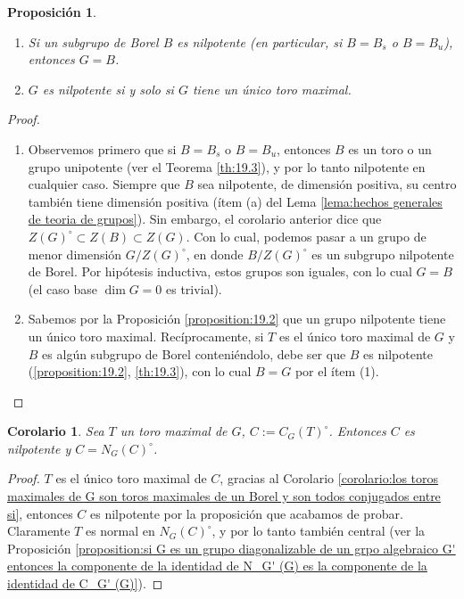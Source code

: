 \documentclass[spanish,10pt]{amsart}
\newtheorem{corollary}[theorem]{Corolario}
\newtheorem{proposition}[theorem]{Proposición}
\theoremstyle{definition}
\theoremstyle{remark}
\numberwithin{equation}{section}
\begin{document}
\begin{proposition}
\begin{enumerate}[(1)]
\item Si un subgrupo de Borel $B$ es nilpotente (en particular, si $B = B_s$ o $B = B_u$), entonces $G = B$.
\item $G$ es nilpotente si y solo si $G$ tiene un único toro maximal.
\end{enumerate}
\end{proposition}
\begin{proof}
\begin{enumerate}[(1)]
\item Observemos primero que si $B = B_s$ o $B = B_u$, entonces $B$ es un toro o un grupo unipotente (ver el Teorema \ref{th:19.3}), y por lo tanto nilpotente en cualquier caso. Siempre que $B$ sea nilpotente, de dimensión positiva, su centro también tiene dimensión positiva (ítem (a) del Lema \ref{lema:hechos generales de teoria de grupos}). Sin embargo, el corolario anterior dice que $Z(G)^\circ \subset Z (B) \subset Z (G)$. Con lo cual, podemos pasar a un grupo de menor dimensión $G/Z(G)^{\circ}$, en donde $B / Z(G)^\circ$ es un subgrupo nilpotente de Borel. Por hipótesis inductiva, estos grupos son iguales, con lo cual $G = B$ (el caso base $\dim G = 0$ es trivial).
\item Sabemos por la Proposición \ref{proposition:19.2} que un grupo nilpotente tiene un único toro maximal. Recíprocamente, si $T$ es el único toro maximal de $G$ y $B$ es algún subgrupo de Borel conteniéndolo, debe ser que $B$ es nilpotente (\ref{proposition:19.2}, \ref{th:19.3}), con lo cual $B = G$ por el ítem (1).
\end{enumerate}
\end{proof}

\begin{corollary}
Sea $T$ un toro maximal de $G$, $C := C_G (T)^\circ$. Entonces $C$ es nilpotente y $C = N_G (C)^\circ$.
\end{corollary}
\begin{proof}
$T$ es el único toro maximal de $C$, gracias al Corolario \ref{corolario:los toros maximales de G son toros maximales de un Borel y son todos conjugados entre si}, entonces $C$ es nilpotente por la proposición que acabamos de probar. Claramente $T$ es normal en $N_G (C)^\circ$, y por lo tanto también central (ver la Proposición \ref{proposition:si G es un grupo diagonalizable de un grpo algebraico G' entonces la componente de la identidad de N_G' (G) es la componente de la identidad de C_G' (G)}).
\end{proof}
\end{document}
